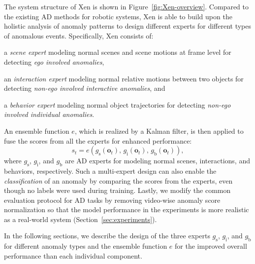 The system structure of Xen is shown in Figure~\ref{fig:Xen-overview}. Compared to the existing AD methods for robotic systems, Xen is able to build upon the holistic analysis of anomaly patterns to design different experts for different types of anomalous events. Specifically, Xen consists of:
\begin{enumerate*}[label=(\arabic*)]
\item
a \textit{scene expert} modeling normal scenes and scene motions at frame level for detecting \textit{ego involved anomalies},
\item
an \textit{interaction expert} modeling normal relative motions between two objects for detecting \textit{non-ego involved interactive anomalies}, and
\item
a \textit{behavior expert} modeling normal object trajectories for detecting \textit{non-ego involved individual anomalies}.
\end{enumerate*}
An ensemble function $e$, which is realized by a Kalman filter, is then applied to fuse the scores from all the experts for enhanced performance:
\begin{equation*}
s_t = e(g_\text{s}(\mathbf{o}_t), \, g_\text{i}(\mathbf{o}_t), \, g_\text{b}(\mathbf{o}_t)),
\end{equation*}
where $g_\text{s}$, $g_\text{i}$, and $g_\text{b}$ are AD experts for modeling normal scenes, interactions, and behaviors, respectively. Such a multi-expert design can also enable the \textit{classification} of an anomaly by comparing the scores from the experts, even though no labels were used during training. Lastly, we modify the common evaluation protocol for AD tasks by removing video-wise anomaly score normalization so that the model performance in the experiments is more realistic as a real-world system (Section~\ref{sec:experiments}).

In the following sections, we describe the design of the three experts $g_\text{s}$, $g_\text{i}$, and $g_\text{b}$ for different anomaly types and the ensemble function $e$ for the improved overall performance than each individual component.